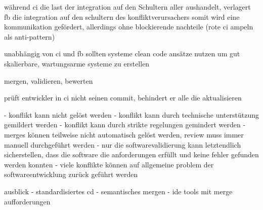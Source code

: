 während ci die last der integration auf den Schultern aller aushandelt, verlagert fb die integration auf den schultern des \glqq konfliktverursachers\grqq{} somit wird eine kommunikation gefördert, allerdings ohne blockierende nachteile (rote ci ampeln als anti-pattern)

unabhängig von ci und fb sollten systeme clean code ansätze nutzen um gut skalierbare, wartungsarme systeme zu erstellen




mergen, validieren, bewerten

prüft entwickler in ci nicht seinen commit, behindert er alle die aktualisieren

- konflikt kann nicht gelöst werden
- konflikt kann durch technische unterstützung gemildert werden
- konflikt kann durch strikte regelungen gemindert werden
- merges können teilweise nicht automatisch gelöst werden, review muss immer manuell durchgeführt werden
- nur die softwarevalidierung kann letztendlich sicherstellen, dass die software die anforderungen erfüllt und keine fehler gefunden werden konnten
- viele konflikte können auf allgemeine problem der softwareentwicklung zurück geführt werden


ausblick
- standardisiertes cd
- semantisches mergen
- ide tools mit merge aufforderungen